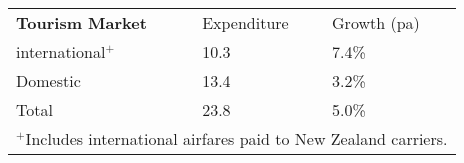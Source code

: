 \begin{tabular}[t]{p{5cm}p{1.3cm}p{1.2cm}}
 \textbf{Tourism Market} & Expenditure & Growth (pa) \\ 
 international$^+$ & 10.3 & 7.4\% \\ 
  Domestic & 13.4 & 3.2\% \\ 
  Total & 23.8 & 5.0\% \\ 
  \multicolumn{3}{p{7.5cm}}{$^+$Includes international airfares paid to New Zealand carriers.}\ 
\end{tabular}
